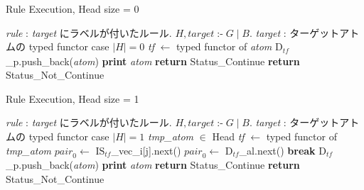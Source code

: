 \begin{algorithm}
    \caption{Rule Execution, Head size = 0}
\begin{algorithmic}
    \scriptsize
    \Require \textit{rule} : \textit{target} にラベルが付いたルール. $H,\mathit{target} \mathrel{\texttt{:-}} G \mathrel{\texttt{|}} B.$
    \Require \textit{target} : ターゲットアトムの typed functor
        \State case $|H|=0$
                \State \textit{tf} $\gets$ typed functor of \textit{atom}
                    \State $\text{D}_\mathit{tf}$\_p.push\_back(\textit{atom})
                \Else
                    \State \textbf{print} \textit{atom}
                \EndIf
            \EndFor
                \State \textbf{return} Status\_Continue
            \EndIf
        \EndIf
        \State \textbf{return} Status\_Not\_Continue
    \EndProcedure
\end{algorithmic}
\end{algorithm}


\begin{algorithm}
    \caption{Rule Execution, Head size = 1}
\begin{algorithmic}
    \scriptsize
    \Require \textit{rule} : \textit{target} にラベルが付いたルール. $H,\mathit{target} \mathrel{\texttt{:-}} G \mathrel{\texttt{|}} B.$
    \Require \textit{target} : ターゲットアトムの typed functor
        \State case $|H|=1$
        \State \textit{tmp\_atom} $\in$ Head
        \State \textit{tf} $\gets$ typed functor of \textit{tmp\_atom} 
                \State $\textit{pair}_0 \gets$ $\text{IS}_\textit{tf}$\_vec\_i[j].next() 
            \Else
                \State $\textit{pair}_0 \gets$ $\text{D}_\textit{tf}$\_al.next()
            \EndIf
             
                \State \textbf{break}
            \EndIf
                        \State $\text{D}_\textit{tf}$\_p.push\_back(\textit{atom})
                    \Else
                        \State \textbf{print} \textit{atom}
                    \EndIf
                \EndFor
                    \State \textbf{return} Status\_Continue
                \EndIf
            \EndIf
        \EndWhile
        \State \textbf{return} Status\_Not\_Continue
    \EndProcedure
\end{algorithmic}
\end{algorithm}



